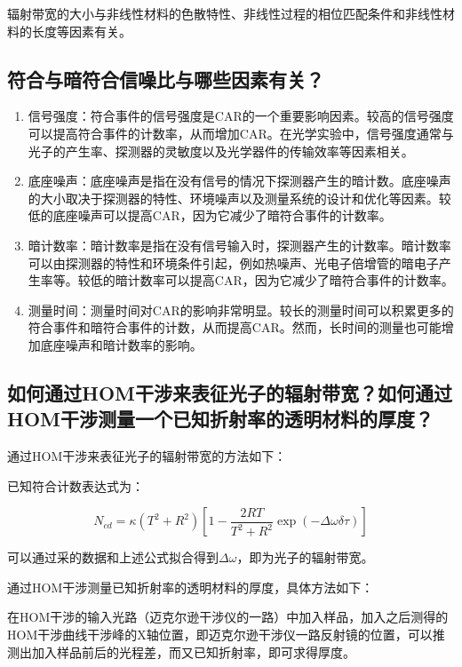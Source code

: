 \documentclass[a4paper,UTF8]{ctexart}
\begin{document}
辐射带宽的大小与非线性材料的色散特性、非线性过程的相位匹配条件和非线性材料的长度等因素有关。

\subsection{符合与暗符合信噪比与哪些因素有关？}

\begin{enumerate}
    \item 信号强度：符合事件的信号强度是CAR的一个重要影响因素。较高的信号强度可以提高符合事件的计数率，从而增加CAR。在光学实验中，信号强度通常与光子的产生率、探测器的灵敏度以及光学器件的传输效率等因素相关。
    \item 底座噪声：底座噪声是指在没有信号的情况下探测器产生的暗计数。底座噪声的大小取决于探测器的特性、环境噪声以及测量系统的设计和优化等因素。较低的底座噪声可以提高CAR，因为它减少了暗符合事件的计数率。
    \item 暗计数率：暗计数率是指在没有信号输入时，探测器产生的计数率。暗计数率可以由探测器的特性和环境条件引起，例如热噪声、光电子倍增管的暗电子产生率等。较低的暗计数率可以提高CAR，因为它减少了暗符合事件的计数率。
    \item 测量时间：测量时间对CAR的影响非常明显。较长的测量时间可以积累更多的符合事件和暗符合事件的计数，从而提高CAR。然而，长时间的测量也可能增加底座噪声和暗计数率的影响。
\end{enumerate}

\subsection{如何通过HOM干涉来表征光子的辐射带宽？如何通过HOM干涉测量一个已知折射率的透明材料的厚度？}

通过HOM干涉来表征光子的辐射带宽的方法如下：

已知符合计数表达式为：

\begin{equation}
    N_{cd} = \kappa (T^2+R^2)[1-\frac{2RT}{T^2+R^2}\exp{(-\Delta \omega \delta \tau)}]
\end{equation}

可以通过采的数据和上述公式拟合得到$\Delta \omega$，即为光子的辐射带宽。

通过HOM干涉测量已知折射率的透明材料的厚度，具体方法如下：

在HOM干涉的输入光路（迈克尔逊干涉仪的一路）中加入样品，加入之后测得的HOM干涉曲线干涉峰的X轴位置，即迈克尔逊干涉仪一路反射镜的位置，可以推测出加入样品前后的光程差，而又已知折射率，即可求得厚度。
\end{document}
